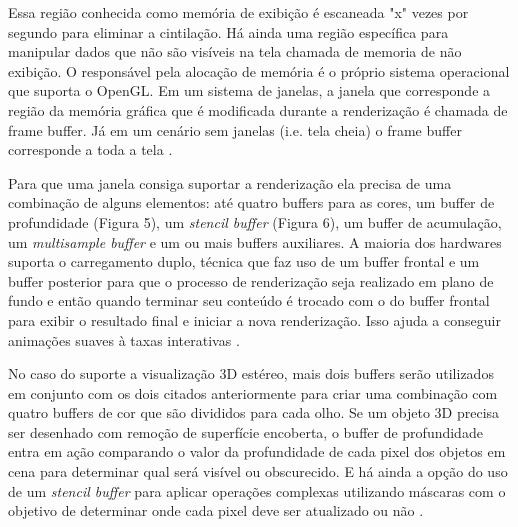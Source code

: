 Essa região conhecida como memória de exibição é escaneada "x" vezes por segundo para eliminar a cintilação. Há ainda uma região específica para manipular dados que não são visíveis na tela chamada de memoria de não exibição. O responsável pela alocação de memória é o próprio sistema operacional que suporta o OpenGL. Em um sistema de janelas, a janela que corresponde a região da memória gráfica que é modificada durante a renderização é chamada de frame buffer. Já em um cenário sem janelas (i.e. tela cheia) o frame buffer corresponde a toda a tela \cite{GLSLBook}.

Para que uma janela consiga suportar a renderização ela precisa de uma combinação de alguns elementos: até quatro buffers para as cores, um buffer de profundidade (Figura 5), um \textit{stencil buffer} (Figura 6), um buffer de acumulação, um \textit{multisample buffer} e um ou mais buffers auxiliares. A maioria dos hardwares suporta o carregamento duplo, técnica que faz uso de um buffer frontal e um buffer posterior para que o processo de renderização seja realizado em plano de fundo e então quando terminar seu conteúdo é trocado com o do buffer frontal para exibir o resultado final e iniciar a nova renderização. Isso ajuda a conseguir animações suaves à taxas interativas \cite{GLSLBook}.

    \begin{figure}[h!]
		\centering
	\end{figure}
	\nocite{dptbuf}
	
No caso do suporte a visualização 3D estéreo, mais dois buffers serão utilizados em conjunto com os dois citados anteriormente para criar uma combinação com quatro buffers de cor que são divididos para cada olho. Se um objeto 3D precisa ser desenhado com remoção de superfície encoberta, o buffer de profundidade entra em ação comparando o valor da profundidade de cada pixel dos objetos em cena para determinar qual será visível ou obscurecido. E há ainda a opção do uso de um \textit{stencil buffer} para aplicar operações complexas utilizando máscaras com o objetivo de determinar onde cada pixel deve ser atualizado ou não \cite{GLSLBook}.


